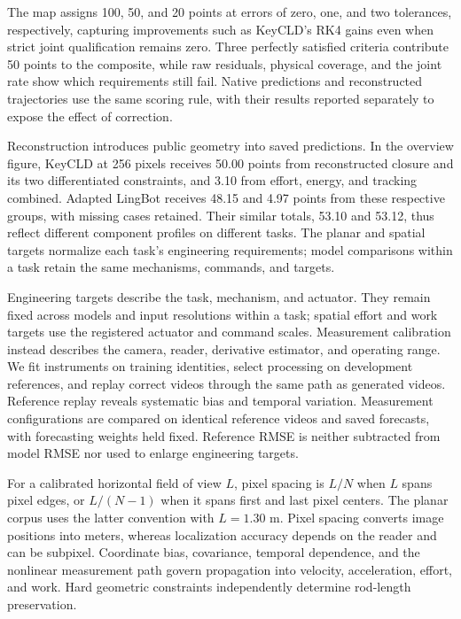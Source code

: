 The map assigns 100, 50, and 20 points at errors of zero, one, and two tolerances, respectively, capturing improvements such as KeyCLD's RK4 gains even when strict joint qualification remains zero. Three perfectly satisfied criteria contribute 50 points to the composite, while raw residuals, physical coverage, and the joint rate show which requirements still fail. Native predictions and reconstructed trajectories use the same scoring rule, with their results reported separately to expose the effect of correction.

Reconstruction introduces public geometry into saved predictions. In the overview figure, KeyCLD at 256 pixels receives 50.00 points from reconstructed closure and its two differentiated constraints, and 3.10 from effort, energy, and tracking combined. Adapted LingBot receives 48.15 and 4.97 points from these respective groups, with missing cases retained. Their similar totals, 53.10 and 53.12, thus reflect different component profiles on different tasks. The planar and spatial targets normalize each task's engineering requirements; model comparisons within a task retain the same mechanisms, commands, and targets.

Engineering targets describe the task, mechanism, and actuator. They remain fixed across models and input resolutions within a task; spatial effort and work targets use the registered actuator and command scales. Measurement calibration instead describes the camera, reader, derivative estimator, and operating range. We fit instruments on training identities, select processing on development references, and replay correct videos through the same path as generated videos. Reference replay reveals systematic bias and temporal variation. Measurement configurations are compared on identical reference videos and saved forecasts, with forecasting weights held fixed. Reference RMSE is neither subtracted from model RMSE nor used to enlarge engineering targets.

For a calibrated horizontal field of view $L$, pixel spacing is $L/N$ when $L$ spans pixel edges, or $L/(N-1)$ when it spans first and last pixel centers. The planar corpus uses the latter convention with $L=1.30$ m. Pixel spacing converts image positions into meters, whereas localization accuracy depends on the reader and can be subpixel. Coordinate bias, covariance, temporal dependence, and the nonlinear measurement path govern propagation into velocity, acceleration, effort, and work. Hard geometric constraints independently determine rod-length preservation.

